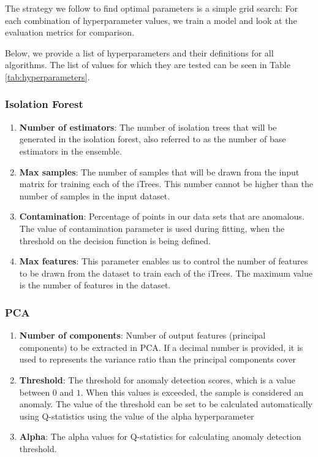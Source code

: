 The strategy we follow to find optimal parameters is a simple grid search: For each combination of hyperparameter values, we train a model and look at the evaluation metrics for comparison.

Below, we provide a list of hyperparameters and their definitions for all algorithms. The list of values for which they are tested can be seen in Table \ref{tab:hyperparameters}.


\subsubsection*{Isolation Forest}
\begin{enumerate}
    \item \textbf{Number of estimators}: The number of isolation trees that will be generated in the isolation forest, also referred to as the number of base estimators in the ensemble.
    \item \textbf{Max samples}: The number of samples that will be drawn from the input matrix for training each of the iTrees. This number cannot be higher than the number of samples in the input dataset. 
    \item \textbf{Contamination}: Percentage of points in our data sets that are anomalous. The value of contamination parameter is used during fitting, when the threshold on the decision function is being defined.
    \item \textbf{Max features}: This parameter enables us to control the number of features to be drawn from the dataset to train each of the iTrees. The maximum value is the number of features in the dataset. 
\end{enumerate}

\subsubsection*{PCA}
\begin{enumerate}
    \item \textbf{Number of components}: Number of output features (principal components) to be extracted in PCA. If a decimal number is provided, it is used to represents the variance ratio than the principal components cover
    \item \textbf{Threshold}: The threshold for anomaly detection scores, which is a value between $0$ and $1$. When this values is exceeded, the sample is considered an anomaly. The value of the threshold can be set to be calculated automatically using Q-statistics using the value of the alpha hyperparameter
    \item \textbf{Alpha}: The alpha values for Q-statistics for calculating anomaly detection threshold. 
\end{enumerate}

